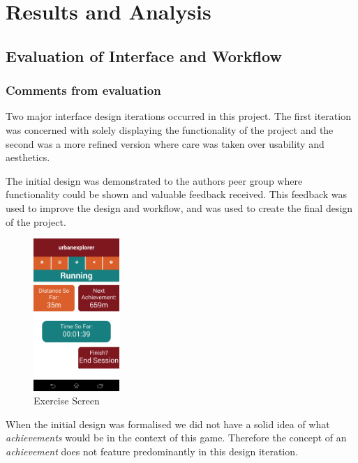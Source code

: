 \chapter{Results and Analysis}\label{ch_results}

\section{Evaluation of Interface and Workflow}
\subsection{Comments from evaluation}
Two major interface design iterations occurred in this project. The
first iteration was concerned with solely displaying the functionality
of the project and the second was a more refined version where care
was taken over usability and aesthetics. 

The initial design was demonstrated to the authors peer group where
functionality could be shown and valuable feedback received. This
feedback was used to improve the design and workflow, and was used to
create the final design of the project. 

\begin{figure}
  \vspace{-35pt}
  \centering
  \includegraphics[width=0.29\textwidth]{images/init_design/run.png}
  \vspace{-20pt}
  \caption{Exercise Screen}
  \vspace{-25pt}
  \label{fig:init_run}
\end{figure}
When the initial design was formalised we did not have a solid idea of
what \emph{achievements} would be in the context of this
game. Therefore the concept of an \emph{achievement} does not feature
predominantly in this design iteration. 

